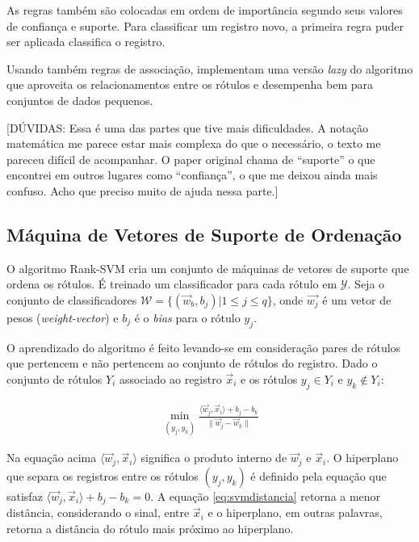 \documentclass[runningheads,a4paper]{llncs}
\begin{document}
As regras também são colocadas em ordem de importância segundo seus valores de confiança e suporte. Para classificar um registro novo, a primeira regra puder ser aplicada classifica o registro.

Usando também regras de associação, \cite{Veloso2007-el} implementam uma versão \textit{lazy} do algoritmo que aproveita os relacionamentos entre os rótulos e desempenha bem para conjuntos de dados pequenos.

[DÚVIDAS: Essa é uma das partes que tive mais dificuldades. A notação matemática me parece estar mais complexa do que o necessário, o texto me pareceu difícil de acompanhar. O paper original chama de \enquote{suporte} o que encontrei em outros lugares como \enquote{confiança}, o que me deixou ainda mais confuso. Acho que preciso muito de ajuda nessa parte.]

\subsection{Máquina de Vetores de Suporte de Ordenação}

O algoritmo Rank-SVM \cite{Elisseeff2001-lp} cria um conjunto de máquinas de vetores de suporte que ordena os rótulos. É treinado um classificador para cada rótulo em $\mathcal{Y}$. Seja o conjunto de classificadores $\mathcal{W} = \{ (\vec{w}_b, b_j) | 1 \leq j \leq q \}$, onde $\vec{w_j}$ é um vetor de pesos (\textit{weight-vector}) e $b_j$ é o \textit{bias} para o rótulo $y_j$.

O aprendizado do algoritmo é feito levando-se em consideração pares de rótulos que pertencem e não pertencem ao conjunto de rótulos do registro. Dado o conjunto de rótulos $Y_i$ associado ao registro $\vec{x}_i$ e os rótulos $y_j \in Y_i$ e $y_k \notin Y_i$:

\begin{align} \label{eq:svmdistancia}
	\min_{(y_j, y_k)} \frac{\langle \vec{w}_j, \vec{x}_i \rangle + b_j - b_k}{\lVert \vec{w}_j - \vec{w}_k \rVert}
\end{align}

Na equação acima $\langle \vec{w}_j, \vec{x}_i \rangle$ significa o produto interno de $\vec{w}_j$ e $\vec{x}_i$. O hiperplano que separa os registros entre os rótulos $(y_j, y_k)$ é definido pela equação que satisfaz $\langle \vec{w}_j, \vec{x}_i \rangle + b_j - b_k = 0$.  A equação \ref{eq:svmdistancia} retorna a menor distância, considerando o sinal, entre $\vec{x}_i$ e o hiperplano, em outras palavras, retorna a distância do rótulo mais próximo ao hiperplano.
\end{document}

